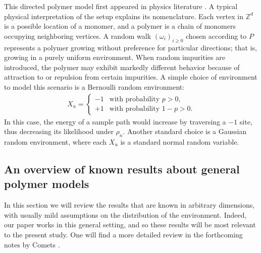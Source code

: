 \documentclass[11pt,reqno]{amsart}
\numberwithin{equation}{section}
\theoremstyle{definition}
\begin{document}
This directed polymer model first appeared in physics literature \cite{huse-henley85,kardar85,huse-henley-fisher85,kardar-nelson85,kardar-zhang87}.
A typical physical interpretation of the setup explains its nomenclature.
Each vertex in ${\mathbb{Z}}^d$ is a possible location of a monomer, and a polymer is a chain of monomers occupying neighboring vertices.
A random walk $(\omega_i)_{i \geq 0}$ chosen according to $P$ represents a polymer growing without preference for particular directions; that is, growing in a purely uniform environment.
When random impurities are introduced, the polymer may exhibit markedly different behavior because of attraction to or repulsion from certain impurities.
A simple choice of environment to model this scenario is a Bernoulli random environment:
{\begin{align*} {
X_u = \begin{cases}
-1 &\text{with probability $p > 0$,} \\
+1 &\text{with probability $1 - p > 0$}.
\end{cases}
} \end{align*}}
In this case, the energy of a sample path would increase by traversing a $-1$ site, thus decreasing its likelihood under $\rho_n$.
Another standard choice is a Gaussian random environment, where each $X_u$ is a standard normal random variable.

\subsection{An overview of known results about general polymer models} \label{disorder_background}
In this section we will review the results that are known in arbitrary dimensions, with usually mild assumptions on the distribution of the environment.
Indeed, our paper works in this general setting, and so these results will be most relevant to the present study.
One will find a more detailed review in the forthcoming notes by Comets \cite{comets17}.
\end{document}

